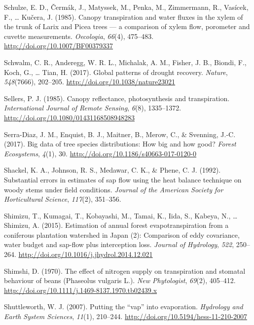 \documentclass[11pt,twoside]{reedthesis}
\begin{document}
\hypertarget{ref-schulze_canopy_1985}{}
Schulze, E. D., Čermák, J., Matyssek, M., Penka, M., Zimmermann, R.,
Vasícek, F., \ldots{} Kučera, J. (1985). Canopy transpiration and water
fluxes in the xylem of the trunk of Larix and Picea trees --- a
comparison of xylem flow, porometer and cuvette measurements.
\emph{Oecologia}, \emph{66}(4), 475--483.
\url{http://doi.org/10.1007/BF00379337}

\hypertarget{ref-Schwalm2017}{}
Schwalm, C. R., Anderegg, W. R. L., Michalak, A. M., Fisher, J. B.,
Biondi, F., Koch, G., \ldots{} Tian, H. (2017). Global patterns of
drought recovery. \emph{Nature}, \emph{548}(7666), 202--205.
\url{http://doi.org/10.1038/nature23021}

\hypertarget{ref-Sellers1985}{}
Sellers, P. J. (1985). Canopy reflectance, photosynthesis and
transpiration. \emph{International Journal of Remote Sensing},
\emph{6}(8), 1335--1372. \url{http://doi.org/10.1080/01431168508948283}

\hypertarget{ref-serra-diaz_big_2017}{}
Serra-Diaz, J. M., Enquist, B. J., Maitner, B., Merow, C., \& Svenning,
J.-C. (2017). Big data of tree species distributions: How big and how
good? \emph{Forest Ecosystems}, \emph{4}(1), 30.
\url{http://doi.org/10.1186/s40663-017-0120-0}

\hypertarget{ref-Shackel1992}{}
Shackel, K. A., Johnson, R. S., Medawar, C. K., \& Phene, C. J. (1992).
Substantial errors in estimates of sap flow using the heat balance
technique on woody stems under field conditions. \emph{Journal of the
American Society for Horticultural Science}, \emph{117}(2), 351--356.

\hypertarget{ref-Shimizu2015}{}
Shimizu, T., Kumagai, T., Kobayashi, M., Tamai, K., Iida, S., Kabeya,
N., \ldots{} Shimizu, A. (2015). Estimation of annual forest
evapotranspiration from a coniferous plantation watershed in Japan (2):
Comparison of eddy covariance, water budget and sap-flow plus
interception loss. \emph{Journal of Hydrology}, \emph{522}, 250--264.
\url{http://doi.org/10.1016/j.jhydrol.2014.12.021}

\hypertarget{ref-shimshi_effect_1970}{}
Shimshi, D. (1970). The effect of nitrogen supply on transpiration and
stomatal behaviour of beans (Phaseolus vulgaris L.). \emph{New
Phytologist}, \emph{69}(2), 405--412.
\url{http://doi.org/10.1111/j.1469-8137.1970.tb02439.x}

\hypertarget{ref-Shuttleworth2008}{}
Shuttleworth, W. J. (2007). Putting the ``vap'' into evaporation.
\emph{Hydrology and Earth System Sciences}, \emph{11}(1), 210--244.
\url{http://doi.org/10.5194/hess-11-210-2007}
\end{document}
